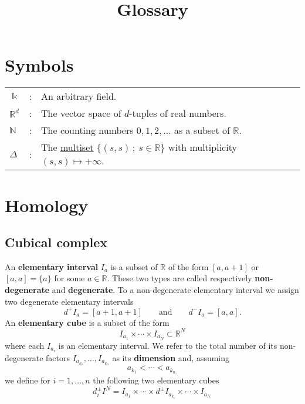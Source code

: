 \documentclass{amsart}
\begin{document}
	\title{Glossary}
	\maketitle

	\section{Symbols}
	
	\begin{tabular}{ l l l}
		$\Bbbk$ & : & An arbitrary field. \\
		$\mathbb R^d$ & : & The vector space of $d$-tuples of real numbers. \\
		$\mathbb N$ & : & The counting numbers $0,1,2, \dots$ as a subset of $\mathbb R$. \\
		$\Delta$ & : & The \hyperref[multiset]{multiset} $\{(s,s)\,;\ s \in \mathbb R\}$ with multiplicity $(s,s) \mapsto +\infty$.
	\end{tabular}
	
	\section{Homology}
	
	\subsection*{Cubical complex} \label{cubical complex}
	
	An \textbf{elementary interval} $I_a$ is a subset of $\mathbb{R}$ of the form $[a, a+1]$ or $[a,a] = \{a\}$ for some $a \in \mathbb{R}$. These two types are called respectively \textbf{non-degenerate} and \textbf{degenerate}. To a non-degenerate elementary interval we assign two degenerate elementary intervals
	\begin{equation*}
	d^+ I_a = [a+1, a+1] \qquad \text{and} \qquad d^- I_a = [a, a].
	\end{equation*}
	An \textbf{elementary cube} is a subset of the form 
	\begin{equation*}
	I_{a_1} \times \cdots \times I_{a_N} \subset \mathbb{R}^N
	\end{equation*}
	where each $I_{a_i}$ is an elementary interval. We refer to the total number of its non-degenerate factors $I_{a_{k_1}}, \dots, I_{a_{k_n}}$ as its \textbf{dimension} and, assuming
	\begin{equation*}
	a_{k_1} < \cdots < a_{k_{n,}}
	\end{equation*}
	we define for $i = 1, \dots, n$ the following two elementary cubes
	\begin{equation*}
	d_i^\pm I^N = I_{a_1} \times \cdots \times d^\pm I_{a_{k_i}} \times \cdots \times I_{a_{N.}}
	\end{equation*}
	
\end{document}
